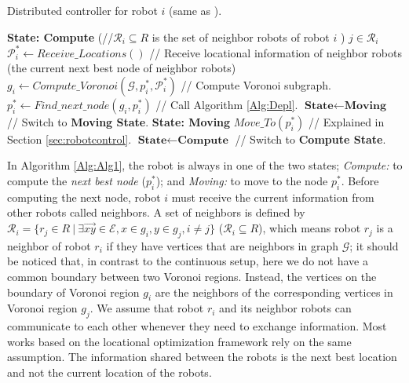 \documentclass[smallcondensed]{svjour3}
\begin{document}
\begin{algorithm}[h]
\caption[Distributed controller]{ Distributed controller for robot $i$ (same as \cite{Yun2013}). }
\label{Alg:Alg1}
\SetAlgoVlined
\DontPrintSemicolon
{}
%
   \nl \textbf{State: Compute }\;
  \nl \ForEach({\color{blue}//$\mathcal R_i \subseteq R$ is the set of neighbor robots of robot $i$}\color{black} ) {$j \in \mathcal R_i$}	
		{	
			$\mathcal{P}_i^*\gets Receive\_Locations()$	{\color{blue} // Receive locational information of neighbor robots (the current next best node of neighbor robots)}\;		
		}
	 \nl $g_i \gets Compute\_Voronoi(\mathcal G,p_i^*,\mathcal{P}_i^*)$ {// \color{blue} Compute Voronoi subgraph.}\;
	 \nl $p_i^* \gets Find\_next\_node(g_i,p_i^*) $ { \color{blue} // Call Algorithm \ref{Alg:Depl}.}\;
	  {
		\nl $\textbf{State} \gets \textbf{Moving}$ { \color{blue} // Switch to \textbf{Moving State}.}\;
	  } 
   \nl \textbf{State: Moving }\;
	 \nl $Move\_To(p_i^*) $  { \color{blue} // Explained in Section \ref{sec:robotcontrol}.}\;
	  {
				\nl $\textbf{State} \gets \textbf{Compute}$  {// \color{blue} Switch to \textbf{Compute State}.}\;
	  } 
\end {algorithm}
%
In Algorithm \ref{Alg:Alg1}, the robot is always in one of the two states; \textit{Compute:} to compute the \textit{next best node} ($p_i^*$); and \textit{Moving:} to move to the node $p_i^*$.
Before computing the next node, robot $i$ must receive the current information from other robots called neighbors.
%
A set of neighbors is defined by $\mathcal R_i=\{r_j \in R ~|~ \exists \overrightarrow{xy} \in \mathcal E, x \in g_i, y \in g_j, i \neq j \}$ ($\mathcal R_i \subseteq R$), which means robot $r_j$ is a neighbor of robot $r_i$ if they have vertices that are neighbors in graph $\mathcal G$; it should be noticed that, in contrast to the continuous setup, here we do not have a common boundary between two Voronoi regions. Instead, the vertices on the boundary of Voronoi region $g_i$ are the neighbors of the corresponding vertices in Voronoi region $g_j$.
%
 We assume that robot $r_i$ and its neighbor robots can communicate to each other whenever they need to exchange information. Most works based on the locational optimization framework rely on the same assumption. The information shared between the robots is the next best location and not the current location of the robots. 
 
\end{document}
